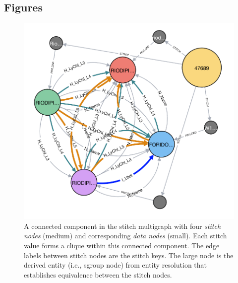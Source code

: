 \documentclass{bmcart}
\begin{document}
\begin{backmatter}




\section*{Figures}
\begin{figure}[ht!]
\caption{ A connected component in the
  stitch multigraph with four \emph{stitch nodes} (medium) and
  corresponding \emph{data nodes} (small). Each stitch value forms a
  clique within this connected component. The edge labels between
  stitch nodes are the stitch keys. 
  The large node is the derived entity (i.e., sgroup node) from entity
  resolution that establishes equivalence between the stitch 
  nodes.}\label{fig:graph1}
\centerline{\includegraphics[scale=0.5]{graph3}}
\end{figure}


\end{backmatter}
\end{document}
